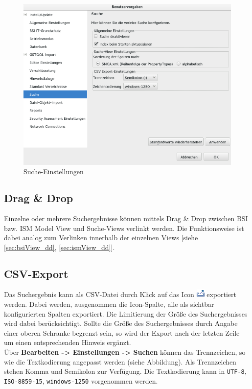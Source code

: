 \documentclass[a4paper,10pt]{book}
\begin{document}
\begin{figure}[h]
  \centering
  \includegraphics[width=.9\textwidth]{Screenshot/search-settings.png}
  \caption{Suche-Einstellungen}
  \label{fig:search-settings}
\end{figure}

\subsection{Drag \& Drop}
Einzelne oder mehrere Suchergebnisse können mittels Drag \& Drop zwischen
BSI bzw. ISM Model View und Suche-Views verlinkt werden. Die
Funktionsweise ist dabei analog zum Verlinken innerhalb der einzelnen Views
[siehe \ref{sec:bsiView_dd}, \ref{sec:ismView_dd}].

\subsection{CSV-Export}
\label{sec:csv-export}

Das Suchergebnis kann als CSV-Datei durch Klick auf das
Icon \includegraphics[height=2ex]{Icon/Export.png} exportiert
werden. Dabei werden, ausgenommen die Icon-Spalte, alle als sichtbar
konfigurierten Spalten exportiert.  Die Limitierung der Größe des
Suchergebnisses wird dabei berücksichtigt. Sollte die Größe des
Suchergebnisses durch Angabe einer oberen Schranke begrenzt sein, so
wird der Export nach der letzten Zeile um einen entsprechenden Hinweis
ergänzt.\\

Über \textbf{Bearbeiten -> Einstellungen -> Suchen} können das
Trennzeichen, so wie die Textkodierung angepasst werden (siehe
Abbildung). Als Trennzeichen stehen Komma und Semikolon zur
Verfügung. Die Textkodierung kann in \texttt{UTF-8},
\texttt{ISO-8859-15}, \texttt{windows-1250} vorgenommen werden.
\end{document}
